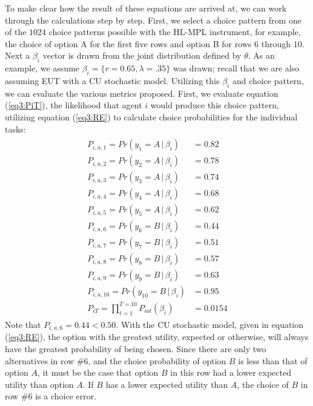 \documentclass[../main.tex]{subfiles}
\begin{document}
To make clear how the result of these equations are arrived at, we can work through the calculations step by step.
First, we select a choice pattern from one of the $1024$ choice patterns possible with the HL-MPL instrument, for example, the choice of option A for the first five rows and option B for rows $6$ through $10$.
Next a $\beta_i$ vector is drawn from the joint distribution defined by $\theta$.
As an example, we assume $\beta_i = \lbrace r = 0.65, \lambda = .35\rbrace$ was drawn; recall that we are also assuming EUT with a CU stochastic model.
Utilizing this $\beta_i$ and choice pattern, we can evaluate the various metrics proposed.
First, we evaluate equation (\ref{eq3:PiT}), the likelihood that agent $i$ would produce this choice pattern, utilizing equation (\ref{eq3:RE}) to calculate choice probabilities for the individual tasks:
\begin{align}
	\label{eq3:example_PiT}
	\begin{split}
		P_{i,a,1}  = Pr(y_1 = A    \,|\, \beta_i)    &= 0.82 \\
		P_{i,a,2}  = Pr(y_2 = A    \,|\, \beta_i)    &= 0.78 \\
		P_{i,a,3}  = Pr(y_3 = A    \,|\, \beta_i)    &= 0.74 \\
		P_{i,a,4}  = Pr(y_4 = A    \,|\, \beta_i)    &= 0.68 \\
		P_{i,a,5}  = Pr(y_5 = A    \,|\, \beta_i)    &= 0.62 \\
		P_{i,a,6}  = Pr(y_6 = B    \,|\, \beta_i)    &= 0.44 \\
		P_{i,a,7}  = Pr(y_7 = B    \,|\, \beta_i)    &= 0.51 \\
		P_{i,a,8}  = Pr(y_8 = B    \,|\, \beta_i)    &= 0.57 \\
		P_{i,a,9}  = Pr(y_9 = B    \,|\, \beta_i)    &= 0.63 \\
		P_{i,a,10} = Pr(y_{10} = B \,|\, \beta_i)    &= 0.95 \\
		P_{iT}     = \prod_{t = 1}^{T = 10} P_{iat}(\beta_i)  &= 0.0154
	\end{split}
\end{align}
\noindent Note that $P_{i,a,6} = 0.44 < 0.50$.
With the CU stochastic model, given in equation (\ref{eq3:RE}), the option with the greatest utility, expected or otherwise, will always have the greatest probability of being chosen.
Since there are only two alternatives in row \#6, and the choice probability of option $B$ is less than that of option $A$, it must be the case that option $B$ in this row had a lower expected utility than option $A$.
If $B$ has a lower expected utility than $A$, the choice of $B$ in row \#6 is a choice error.
\end{document}
